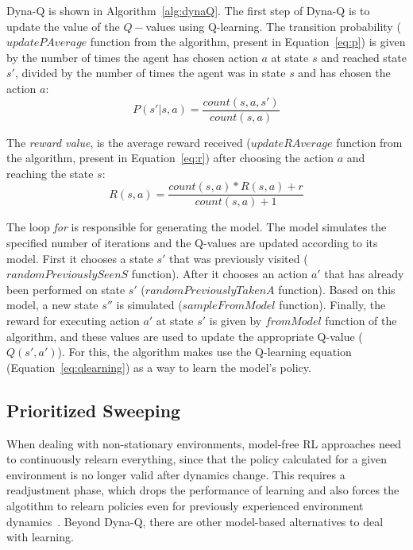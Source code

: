 Dyna-Q is shown in Algorithm~\ref{alg:dynaQ}. The first step of Dyna-Q is to update the value of the $Q-$values using Q-learning.
The transition probability ($updatePAverage$ function from the algorithm, present in Equation~\ref{eq:p}) is given by the number of times the agent has chosen action $a$ at state $s$ and reached state $s'$, divided by the number of times the agent was in state $s$ and has chosen the action $a$:
\begin{equation} \label{eq:p}
	P(s'|s,a) = \frac{count(s,a,s')}{count(s,a)}
\end{equation}

The \textit{reward value}, is the average reward received ($updateRAverage$ function from the algorithm, present in Equation~\ref{eq:r}) after choosing the action $a$ and reaching the state $s$:
\begin{equation} \label{eq:r}
	R(s,a) = \frac{count(s,a) * R(s,a) + r}{count(s,a) + 1}
\end{equation}

The loop \textit{for} is responsible for generating the model.
The model simulates the specified number of iterations and the Q-values are updated according to its model.
First it chooses a state $s'$ that was previously visited ($randomPreviouslySeenS$ function).
After it chooses an action $a'$ that has already been performed on state $s'$ ($randomPreviouslyTakenA$ function).
Based on this model, a new state $s''$ is simulated ($sampleFromModel$ function).
Finally, the reward for executing action $a'$ at state $s'$ is given by $fromModel$ function of the algorithm, and these values are used to update the appropriate Q-value ($Q(s',a')$).
For this, the algorithm makes use the Q-learning equation (Equation~\ref{eq:qlearning}) as a way to learn the model's policy.



\subsection{Prioritized Sweeping}
\label{subsec:ps}

When dealing with non-stationary environments, model-free RL approaches need to continuously relearn everything, since that the policy calculated for a given environment is no longer valid after dynamics change. 
This requires a readjustment phase, which drops the performance of learning and also forces the algotithm to relearn policies even for previously experienced environment dynamics~\cite{de2006reinforcement}.
Beyond Dyna-Q, there are other model-based alternatives to deal with learning.

